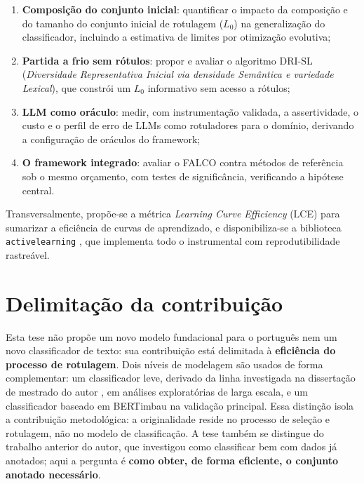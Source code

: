\begin{enumerate}
  \item \textbf{Composição do conjunto inicial}: quantificar o impacto da
  composição e do tamanho do conjunto inicial de rotulagem ($L_0$) na generalização
  do classificador, incluindo a estimativa de limites por otimização evolutiva;
  \item \textbf{Partida a frio sem rótulos}: propor e avaliar o algoritmo
  DRI-SL (\textit{Diversidade Representativa Inicial via densidade Semântica e
  variedade Lexical}), que constrói um $L_0$ informativo sem acesso a rótulos;
  \item \textbf{LLM como oráculo}: medir, com instrumentação validada, a
  assertividade, o custo e o perfil de erro de LLMs como rotuladores para o domínio,
  derivando a configuração de oráculos do framework;
  \item \textbf{O framework integrado}: avaliar o FALCO contra métodos de
  referência sob o mesmo orçamento, com testes de significância, verificando a
  hipótese central.
\end{enumerate}

Transversalmente, propõe-se a métrica \textit{Learning Curve Efficiency} (LCE) para
sumarizar a eficiência de curvas de aprendizado, e disponibiliza-se a biblioteca
\texttt{activelearning} \citep{DaruActiveLearning}, que implementa todo o
instrumental com reprodutibilidade rastreável.

\section{Delimitação da contribuição}
\label{sec:intro-delimitacao}

Esta tese não propõe um novo modelo fundacional para o português nem um novo
classificador de texto: sua contribuição está delimitada à \textbf{eficiência do
processo de rotulagem}. Dois níveis de modelagem são usados de forma complementar:
um classificador leve, derivado da linha investigada na dissertação de mestrado do
autor \citep{Daru2024Dissertacao}, em análises exploratórias de larga escala, e um
classificador baseado em BERTimbau na validação principal. Essa distinção isola a
contribuição metodológica: a originalidade reside no processo de seleção e
rotulagem, não no modelo de classificação. A tese também se distingue do trabalho
anterior do autor, que investigou como classificar bem com dados já anotados; aqui a
pergunta é \textbf{como obter, de forma eficiente, o conjunto anotado necessário}.

